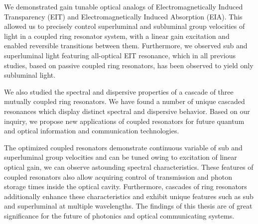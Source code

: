 We demonstrated gain tunable optical analogs of Electromagnetically Induced Transparency (EIT) and Electromagnetically Induced Absorption (EIA). This allowed us to precisely control superluminal and subluminal group velocities of light in a coupled ring resonator system, with a linear gain excitation and enabled reversible transitions between them. Furthermore, we observed sub and superluminal light featuring all-optical EIT resonance, which in all previous studies, based on passive coupled ring resonators, has been observed to yield only subluminal light.

 We also studied the spectral and dispersive properties of a cascade of three mutually coupled ring resonators. We have found a number of unique cascaded resonances which display distinct spectral and dispersive behavior. Based on our inquiry, we propose new applications of coupled resonators for future quantum and optical information and communication technologies.

The optimized coupled resonators demonstrate continuous variable of sub and superluminal group velocities and can be tuned owing to excitation of linear optical gain, we can observe astounding spectral characteristics. These features of coupled resonators also allow acquiring control of transmission and photon storage times inside the optical cavity. Furthermore, cascades of ring resonators additionally enhance these characteristics and exhibit unique features such as sub and superluminal at multiple wavelengths. The findings of this thesis are of great significance for the future of photonics and optical communicating systems.